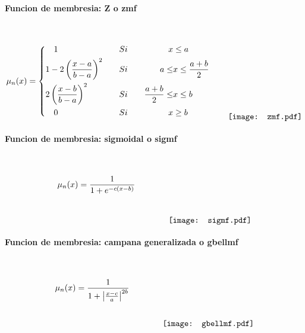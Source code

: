             \paragraph{Funcion de membresia: Z o zmf}$\quad$
                
                \begin{equation}\label{eq:zmf}
                    \mu_n(x) = \left\{
                        \begin{aligned}
                            &\quad 1  &\quad &Si \quad & x &\leq a\\
                            &1 - 2\left(\frac{x - a}{b - a}\right)^2  &\quad &Si \quad &  a \leq &x \leq \frac{a+b}{2} \\
                            &2\left(\frac{x - b}{b - a}\right)^2  &\quad &Si \quad & \frac{a+b}{2} \leq &x \leq b \\
                            &\quad 0  &\quad &Si \quad & x &\geq b
                        \end{aligned}\right.
                        \qquad
                        \raisebox{-15mm}{\texttt{[image: zmf.pdf]}}
                \end{equation}

            \paragraph{Funcion de membresia: sigmoidal o sigmf}$\quad$
                
                \begin{equation}\label{eq:sigmf}
                    \mu_n(x) = \frac{1}{1+e^{-c(x-b)}}
                        \qquad \qquad
                        \raisebox{-15mm}{\texttt{[image: sigmf.pdf]}}
                \end{equation}
               
            \paragraph{Funcion de membresia: campana generalizada o gbellmf}$\quad$
                
                \begin{equation}\label{eq:gbellmf}
                    \mu_n(x) = \frac{1}{1+ \left|\frac{x - c}{a}\right|^{2b}}
                        \qquad \qquad
                        \raisebox{-15mm}{\texttt{[image: gbellmf.pdf]}}
                \end{equation}

